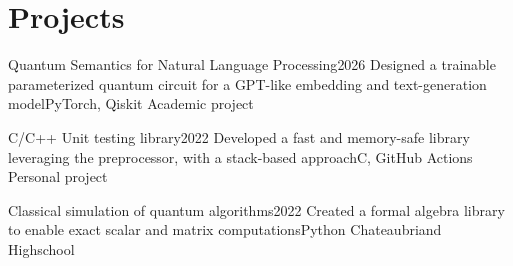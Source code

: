 \section{Projects}
\resumeSubHeadingListStart

\resumeProjectHeading
{Quantum Semantics for Natural Language Processing}{2026}
{Designed a trainable parameterized quantum circuit for a GPT-like embedding and text-generation model}{PyTorch, Qiskit}
{}
{Academic project}
\vspace{-7pt}
\resumeItemListStart
{}
\resumeItemListEnd

\resumeProjectHeading
{C/C++ Unit testing library}{2022}
{Developed a fast and memory-safe library leveraging the preprocessor, with a stack-based approach}{C, GitHub Actions}
{}
{Personal project}
\vspace{-7pt}
\resumeItemListStart
{}
\resumeItemListEnd

\resumeProjectHeading
{Classical simulation of quantum algorithms}{2022}
{Created a formal algebra library to enable exact scalar and matrix computations}{Python}
{}
{Chateaubriand Highschool}
\vspace{-7pt}
\resumeItemListStart
{}
\resumeItemListEnd


\resumeSubHeadingListEnd
